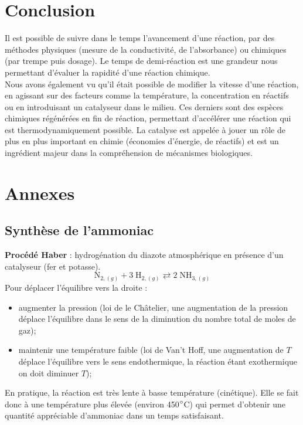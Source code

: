 \documentclass[11pt,a4paper]{report}
\begin{document}
\section*{Conclusion}

Il est possible de suivre dans le temps l'avancement d'une réaction, par des méthodes physiques (mesure de la conductivité, de l'absorbance) ou chimiques (par trempe puis dosage). Le temps de demi-réaction est une grandeur nous permettant d'évaluer la rapidité d'une réaction chimique.\\

Nous avons également vu qu'il était possible de modifier la vitesse d'une réaction, en agissant sur des facteurs comme la température, la concentration en réactifs ou en introduisant un catalyseur dans le milieu. Ces derniers sont des espèces chimiques régénérées en fin de réaction, permettant d'accélérer une réaction qui est thermodynamiquement possible. La catalyse est appelée à jouer un rôle de plus en plus important en chimie (économies d'énergie, de réactifs) et est un ingrédient majeur dans la compréhension de mécanismes biologiques.

\newpage
\section*{Annexes}

\subsection*{Synthèse de l'ammoniac}

\textbf{Procédé Haber} : hydrogénation du diazote atmosphérique en présence d'un catalyseur (fer et potasse).
\begin{equation}
	\text{N}_{2,(g)} + 3\;\text{H}_{2,(g)}  \rightleftarrows 2\;\text{NH}_{3,(g)} 
\end{equation}
Pour déplacer l'équilibre vers la droite :
\begin{itemize}
	\item augmenter la pression (loi de le Châtelier, une augmentation de la pression déplace l'équilibre dans le sens de la diminution du nombre total de moles de gaz);
	\item maintenir une température faible (loi de Van't Hoff, une augmentation de $T$ déplace l'équilibre vers le sens endothermique, la réaction étant exothermique on doit diminuer $T$);
\end{itemize}
En pratique, la réaction est très lente à basse température (cinétique). Elle se fait donc à une température plus élevée (environ 450$\degree$C) qui permet d'obtenir une quantité appréciable d'ammoniac dans un temps satisfaisant.
\end{document}
